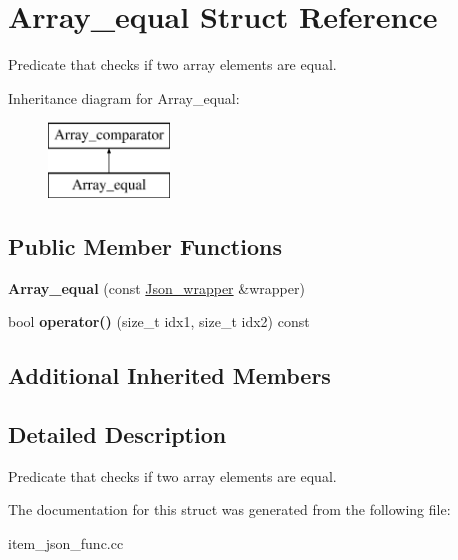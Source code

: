 \hypertarget{structArray__equal}{}\section{Array\+\_\+equal Struct Reference}
\label{structArray__equal}


Predicate that checks if two array elements are equal.  


Inheritance diagram for Array\+\_\+equal\+:\begin{figure}[H]
\begin{center}
\leavevmode
\includegraphics[height=2.000000cm]{structArray__equal}
\end{center}
\end{figure}
\subsection*{Public Member Functions}
\begin{DoxyCompactItemize}
\item 
\mbox{\label{structArray__equal_adc596efc682038d40a10c66e423a0319}} 
{\bfseries Array\+\_\+equal} (const \mbox{\hyperlink{classJson__wrapper}{Json\+\_\+wrapper}} \&wrapper)
\item 
\mbox{\label{structArray__equal_af00f753fcf16b15428432fd5b1f61645}} 
bool {\bfseries operator()} (size\+\_\+t idx1, size\+\_\+t idx2) const
\end{DoxyCompactItemize}
\subsection*{Additional Inherited Members}


\subsection{Detailed Description}
Predicate that checks if two array elements are equal. 

The documentation for this struct was generated from the following file\+:\begin{DoxyCompactItemize}
\item 
item\+\_\+json\+\_\+func.\+cc\end{DoxyCompactItemize}
